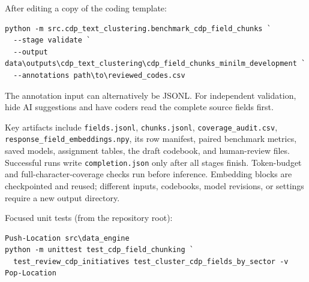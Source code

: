 \documentclass[11pt,a4paper]{article}
\begin{document}
After editing a copy of the coding template:
\begin{verbatim}
python -m src.cdp_text_clustering.benchmark_cdp_field_chunks `
  --stage validate `
  --output data\outputs\cdp_text_clustering\cdp_field_chunks_minilm_development `
  --annotations path\to\reviewed_codes.csv
\end{verbatim}
The annotation input can alternatively be JSONL. For independent validation,
hide AI suggestions and have coders read the complete source fields first.

Key artifacts include \texttt{fields.jsonl}, \texttt{chunks.jsonl},
\texttt{coverage\_audit.csv}, \texttt{response\_field\_embeddings.npy},
its row manifest, paired benchmark metrics, saved models, assignment tables,
the draft codebook, and human-review files.
Successful runs write \texttt{completion.json} only after all stages finish.
Token-budget and full-character-coverage checks run before inference.
Embedding blocks are checkpointed and reused; different inputs, codebooks,
model revisions, or settings require a new output directory.

Focused unit tests (from the repository root):
\begin{verbatim}
Push-Location src\data_engine
python -m unittest test_cdp_field_chunking `
  test_review_cdp_initiatives test_cluster_cdp_fields_by_sector -v
Pop-Location
\end{verbatim}
\end{document}
